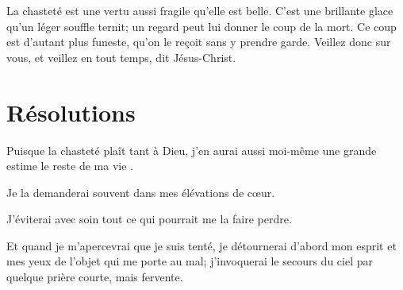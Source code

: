 \documentclass[instructions.tex]{subfiles}
\begin{document}
La chasteté est une vertu aussi fragile qu'elle est belle. C'est une brillante glace qu'un léger souffle ternit; un regard peut lui donner le coup de la mort. Ce coup est d'autant plus funeste, qu'on le reçoit sans y prendre garde. Veillez donc sur vous, et veillez en tout temps, dit Jésus-Christ.
 
\section{Résolutions}
 
\primo Puisque la chasteté plaît tant à Dieu, j'en aurai aussi moi-même une grande estime le reste de ma vie .

\secundo Je la demanderai souvent dans mes élévations de cœur.

\tertio J'éviterai avec soin tout ce qui pourrait me la faire perdre.

\quarto Et quand je m'apercevrai que je suis tenté, je détournerai d'abord mon esprit et mes yeux de l'objet qui me porte au mal; j'invoquerai le secours du ciel par quelque prière courte, mais fervente.

 
\end{document}
